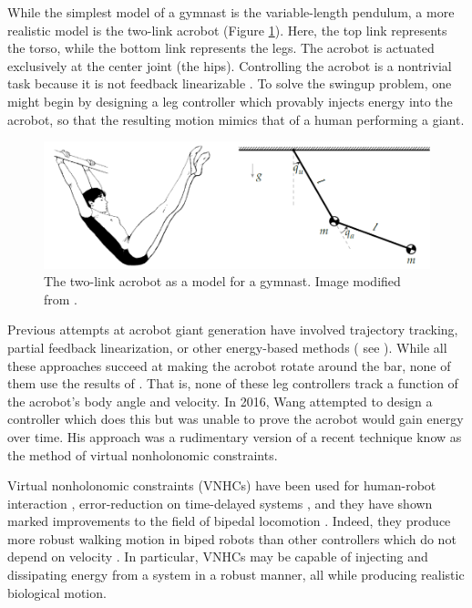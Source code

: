 \documentclass[journal,twoside,web]{ieeecolor}
\begin{document}
While the simplest model of a gymnast is the variable-length pendulum, a
more realistic model is the two-link acrobot (Figure \ref{fig:acrobot}).
Here, the top link represents the torso, while the bottom link represents
the legs. 
The acrobot is actuated exclusively at the center joint (the hips).
Controlling the acrobot is a nontrivial task because it is not feedback
linearizable \cite{nonlinear_controllers_nonintegrable_acrobot}. 
To solve the swingup problem, one might begin by designing a leg controller
which provably injects energy into the acrobot, so that the resulting motion
mimics that of a human performing a giant.

\begin{figure}
    \centering
    \includegraphics[width=\linewidth]{acrobot_gymnast.png}
    \caption{The two-link acrobot as a model for a gymnast.
    Image modified from \cite{xingbo_thesis}.}
    \label{fig:acrobot}
\end{figure}

Previous attempts at acrobot giant generation have involved
trajectory tracking, partial feedback linearization, or other energy-based
methods
( see
\cite{energy_pumping_robotic_swinging,swingup_giant_acrobot,dynamical_servo_acrobot_vc,control_giant_two_link_gymnastic_robot}
).
While all these approaches succeed at making the acrobot rotate around the
bar, none of them use the results of \cite{pendulum_length_giant_gymnastics}.
That is, none of these leg controllers track a function of the acrobot's body
angle and velocity.
In 2016, Wang attempted to design a controller which does this \cite{xingbo_thesis}
but was unable to prove the acrobot would gain energy over time.
His approach was a rudimentary version of a recent technique know as the method
of virtual nonholonomic constraints.

Virtual nonholonomic constraints (VNHCs) have been used for human-robot interaction
\cite{vnhc_human_robot_cooperation,psd_based_vnhc_redundant_manipulator,haptic_vnhc},
error-reduction on time-delayed systems \cite{vnhc_time_delay_teleop},
and they have shown marked improvements to the field of bipedal locomotion 
\cite{nhvc_dynamic_walking,
hybrid_zero_dynamics_bipedal_nhvcs,output_nhvc_bipedal_control}.
Indeed, they produce more robust walking motion in biped robots than
other controllers which do not depend on velocity \cite{nhvc_incline_walking}.
In particular, VNHCs may be capable of injecting and
dissipating energy from a system in a robust manner, all while producing
realistic biological motion. 
\end{document}
